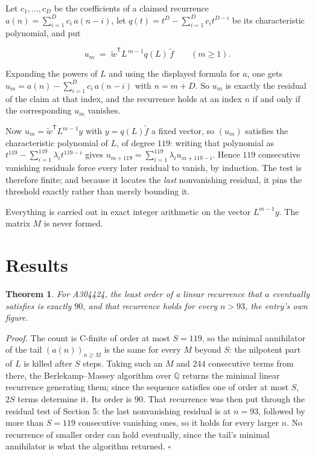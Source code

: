 \documentclass[11pt]{article}
\newtheorem{theorem}{Theorem}
\theoremstyle{definition}
\begin{document}
Let $c_1,\dots,c_D$ be the coefficients of a claimed recurrence $a(n) = \sum_{i=1}^{D} c_i\,a(n-i)$, let $q(t) = t^{D} - \sum_{i=1}^{D} c_i t^{D-i}$ be its characteristic polynomial, and put

\[u_m \;=\; \tilde w^{\mathsf T} L^{\,m-1} q(L)\,\tilde f \qquad (m \ge 1).\]

Expanding the powers of $L$ and using the displayed formula for $a$, one gets $u_m = a(n) - \sum_{i=1}^{D} c_i\,a(n-i)$ with $n = m + D$. So $u_m$ is exactly the residual of the claim at that index, and the recurrence holds at an index $n$ if and only if the corresponding $u_m$ vanishes.

Now $u_m = \tilde w^{\mathsf T} L^{m-1} y$ with $y = q(L)\tilde f$ a fixed vector, so $(u_m)$ satisfies the characteristic polynomial of $L$, of degree $119$: writing that polynomial as $t^{119} - \sum_{i=1}^{119} \lambda_i t^{119-i}$ gives $u_{m+119} = \sum_{i=1}^{119} \lambda_i u_{m+119-i}$. Hence $119$ consecutive vanishing residuals force every later residual to vanish, by induction. The test is therefore finite; and because it locates the {\itshape last} nonvanishing residual, it pins the threshold exactly rather than merely bounding it.

Everything is carried out in exact integer arithmetic on the vector $L^{m-1}y$. The matrix $M$ is never formed.

\section{Results}

\begin{theorem} For A304424, the least order of a linear recurrence that $a$ eventually satisfies is exactly $90$, and that recurrence holds for every $n > 93$, the entry's own figure.\end{theorem}

{\itshape Proof.} The count is C-finite of order at most $S = 119$, so the minimal annihilator of the tail $(a(n))_{n \ge M}$ is the same for every $M$ beyond $S$: the nilpotent part of $L$ is killed after $S$ steps. Taking such an $M$ and $244$ consecutive terms from there, the Berlekamp--Massey algorithm over $\mathbb{Q}$ returns the minimal linear recurrence generating them; since the sequence satisfies one of order at most $S$, $2S$ terms determine it. Its order is $90$. That recurrence was then put through the residual test of Section 5: the last nonvanishing residual is at $n = 93$, followed by more than $S = 119$ consecutive vanishing ones, so it holds for every larger $n$. No recurrence of smaller order can hold eventually, since the tail's minimal annihilator is what the algorithm returned. $\square$
\end{document}
